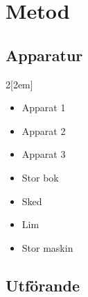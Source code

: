 \section{Metod}
\subsection{Apparatur}

\begin{multicols}{2}[\columnsep2em] 
\begin{itemize}
    \item Apparat 1
    \item Apparat 2
    \item Apparat 3
    \item Stor bok
    \columnbreak
    \item Sked
    \item Lim
    \item Stor maskin
\end{itemize}
\end{multicols}

\subsection{Utförande}
